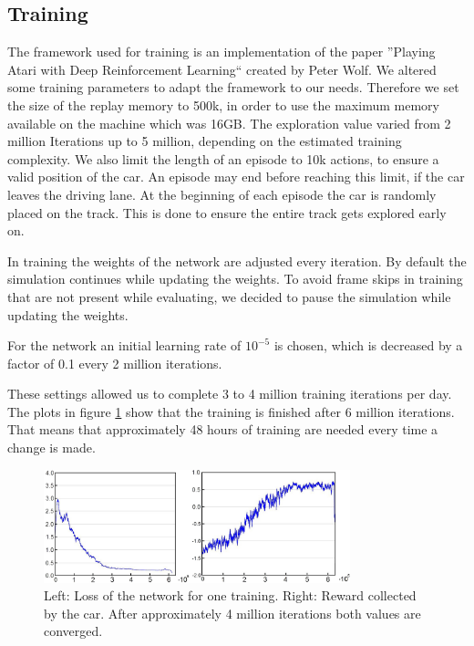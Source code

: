 
\subsection{Training}
The framework used for training is an implementation of the paper ''Playing Atari with Deep Reinforcement Learning``  created by Peter Wolf. We altered some training parameters to adapt the framework to our needs. Therefore we set the size of the replay memory to 500k, in order to use the maximum memory available on the machine which was 16GB. The exploration value varied from 2 million Iterations up to 5 million, depending on the estimated training complexity. We also limit the length of an episode to 10k actions, to ensure a valid position of the car. An episode may end before reaching this limit, if the car leaves the driving lane. At the beginning of each episode the car is randomly placed on the track. This is done to ensure the entire track gets explored early on.

In training the weights of the network are adjusted every iteration. By default the simulation continues while updating the weights. To avoid frame skips in training that are not present while evaluating, we decided to pause the simulation while updating the weights.

For the network an initial learning rate of $10^{-5}$ is chosen, which is decreased by a factor of 0.1 every 2 million iterations.

These settings allowed us to complete 3 to 4 million training iterations per day. The plots in figure \ref{fig:lossandrew} show that the training is finished after 6 million iterations. That means that approximately 48 hours of training are needed every time a change is made.

\begin{figure}[!t]
\centering
\includegraphics[width=3.5in]{../presentation/both-plot.jpg} 
\caption{Left: Loss of the network for one training. Right: Reward collected by the car. After approximately 4 million iterations both values are converged.}
\label{fig:lossandrew}
\end{figure}
 
